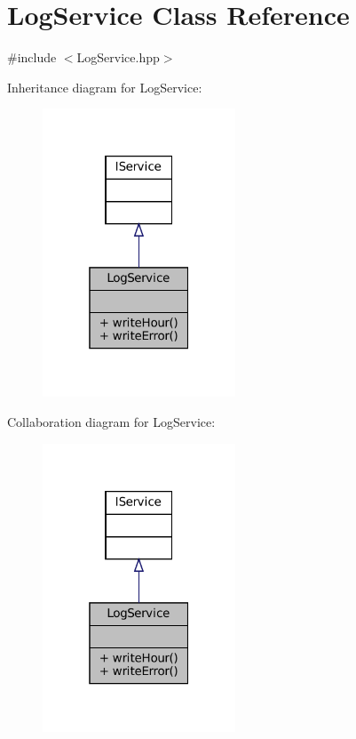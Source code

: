 \hypertarget{classLogService}{}\section{Log\+Service Class Reference}
\label{classLogService}


{\ttfamily \#include $<$Log\+Service.\+hpp$>$}



Inheritance diagram for Log\+Service\+:
\nopagebreak
\begin{figure}[H]
\begin{center}
\leavevmode
\includegraphics[width=163pt]{classLogService__inherit__graph}
\end{center}
\end{figure}


Collaboration diagram for Log\+Service\+:
\nopagebreak
\begin{figure}[H]
\begin{center}
\leavevmode
\includegraphics[width=163pt]{classLogService__coll__graph}
\end{center}
\end{figure}

